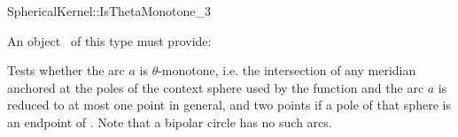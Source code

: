 \begin{ccRefFunctionObjectConcept}{SphericalKernel::IsThetaMonotone_3} 


An object \ccVar\ of this type must provide: 


{Tests whether the arc $a$ is $\theta$-monotone, i.e. the intersection of
any meridian anchored at the poles of the context sphere used by the function 
and the arc $a$ is reduced to at most one point in general, and two points if a pole of that sphere is
an endpoint of . Note that a bipolar circle has no such arcs.
}


\ccSeeAlso



\end{ccRefFunctionObjectConcept}
